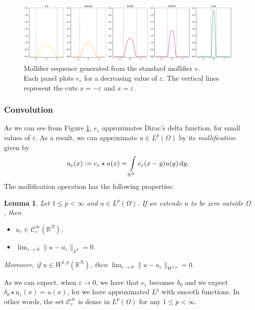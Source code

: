 \documentclass[a4paper,doc,11pt]{article}
\newtheorem{lemma}[theorem]{Lemma}
\newcommand{\R}{\mathbb{R}}
\newcommand{\CC}{\mathcal{C}}
\begin{document}
\begin{figure}
    \centering
    \includegraphics[width = \textwidth]{Fig-1_Moll.pdf}
    \caption{Mollifier sequence generated from the standard mollifier \(e\).\\ Each panel plots \(e_\varepsilon\) for a decreasing value of \(\varepsilon\). The vertical lines represent the cuts \( x = -\varepsilon\) and \(x = \varepsilon\). }
    \label{fig:1-Moll}
\end{figure}


\subsubsection{Convolution}

As we can see from Figure \ref{fig:1-Moll}, \( e_\varepsilon\) approximates Dirac's delta function, for small values of \(\varepsilon\). As a result, we can approximate \(u \in L^p (\Omega)\) by its \emph{mollification} given by
\[
    u_\varepsilon(x) := e_\varepsilon \star  u (x) = \int\limits_{\R^N} e_\varepsilon(x-y) u(y) \dif y.
\]
The mollification operation has the following properties:
\begin{lemma}
    Let \( 1\leq p < \infty\) and \( u \in L^p(\Omega)\). If we extende \(u \) to be zero outside \(\Omega\), then
    \begin{itemize}
        \item \(u_\varepsilon \in \CC_c^\infty (\R^N)\),
        \item \( \lim_{\varepsilon \to 0} \|u - u_\varepsilon\|_{L^p} = 0 \).
    \end{itemize}
    Moreover, if \(u \in W^{1,p} (\R^N)\), then \( \lim_{\varepsilon \to 0} \|u - u_\varepsilon\|_{W^{1,p}} = 0 \).
\end{lemma}

As we can expect, when \(\varepsilon \to 0\), we have that \( e_\varepsilon \) becomes \(\delta_0\) and we expect \( \delta_0 \star u_\varepsilon (x)  = u(x)\), for we have approximated \(L^p\) with smooth functions. In other words, the set \(\CC_c^\infty\) is dense in \(L^p (\Omega)\) for any \( 1 \leq p < \infty\). 
\end{document}
